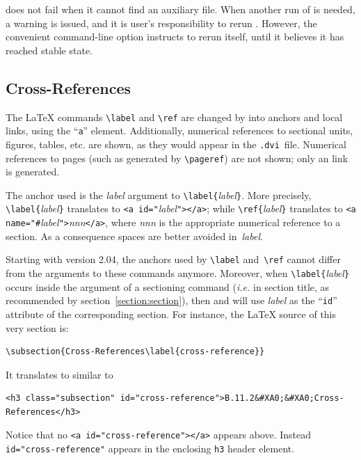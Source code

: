 \noindent\hevea{} does not fail when it cannot find an auxiliary file.
When another run of \hevea{} is needed, a warning is issued,
and it is user's responsibility to rerun \hevea{}.
However, the convenient  command-line option instructs
\hevea{} to rerun itself, until it believes it has reached stable state.

\subsection{Cross-References\label{cross-reference}\label{cross}}
The \LaTeX{} commands \verb+\label+ and \verb+\ref+ are changed by \hevea{}
into {\html} anchors and local links, using the ``\verb+a+'' element.
Additionally, numerical references to sectional units, figures,
tables, etc. are shown, as they would appear in the \texttt{.dvi}~file.
Numerical references to pages (such as generated by \verb+\pageref+)
are not shown; only an link is generated.

The anchor used is the \textit{label} argument to
\verb+\label{+\textit{label}\verb+}+.
More precisely, \verb+\label{+\textit{label}\verb+}+ translates to
\verb+<a id="+\textit{label}\verb+"></a>+;
while \verb+\ref{+\textit{label}\verb+}+
translates to \verb+<a name="#+\textit{label}\verb+">+\textit{nnn}\verb+</a>+,
where \textit{nnn} is the appropriate numerical reference to a section.
As a consequence spaces are better avoided in~\textit{label}.

Starting with \hevea{} version 2.04,
the \html{} anchors used by \verb+\label+ and~\verb+\ref+ cannot
differ from the arguments to these commands anymore.
Moreover,
when \verb+\label{+\textit{label}\verb+}+ occurs
inside the argument of a sectioning command (\emph{i.e.} in section title,
as recommended by section~\ref{section:section}),
then \hevea{} and \hacha{} will use \textit{label}
as the ``\texttt{id}'' attribute of the corresponding section.
For instance, the \LaTeX{} source of this very section is:
\begin{verbatim}
\subsection{Cross-References\label{cross-reference}}
\end{verbatim}
It translates to \html{} similar to
\begin{verbatim}
<h3 class="subsection" id="cross-reference">B.11.2&#XA0;&#XA0;Cross-References</h3>
\end{verbatim}
Notice that no \verb+<a id="cross-reference"></a>+ appears above.
Instead \verb+id="cross-reference"+ appears
in the enclosing \verb+h3+ header element.



